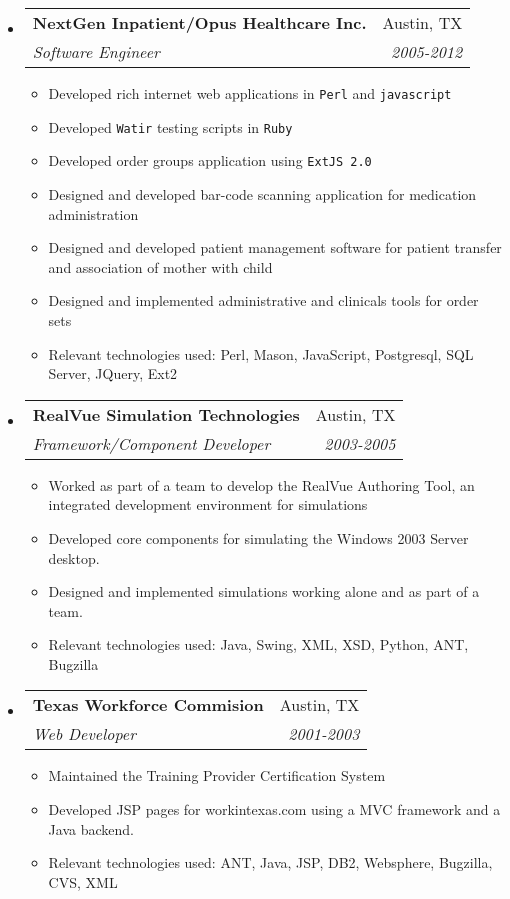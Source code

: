 \documentclass[letterpaper,10pt]{article}
\makeatletter
\newcommand{\resitem}[1]{\item #1 \vspace{-2pt}}
\newcommand{\ressubheading}[4]{

\begin{tabular*}{6.5in}{l@{\cftdotfill{\cftsecdotsep}\extracolsep{\fill}}r}

		\textbf{#1} & #2 \\

		\textit{#3} & \textit{#4} \\

\end{tabular*}\vspace{-6pt}}
\makeatother
\begin{document}
\begin{itemize}

\item

  \ressubheading{NextGen Inpatient/Opus Healthcare Inc.}{Austin, TX}{Software Engineer}{2005-2012}
  
  \begin{itemize}

    \resitem{Developed rich internet web applications in \texttt{Perl} and \texttt{javascript}}
    \resitem{Developed \texttt{Watir} testing scripts in \texttt{Ruby}}
    \resitem{Developed order groups application using \texttt{ExtJS 2.0}}
    \resitem{Designed and developed bar-code scanning application for medication
         		administration}
    \resitem{Designed and developed patient management software for patient transfer and 
		association of mother with child}
    \resitem{Designed and implemented administrative and clinicals tools for order sets}
    \resitem{Relevant technologies used: Perl, Mason, JavaScript, Postgresql, SQL Server, JQuery, Ext2}

  \end{itemize}

\item

  \ressubheading{RealVue Simulation Technologies}{Austin, TX}{Framework/Component Developer}{2003-2005}

  \begin{itemize}

    \resitem{Worked as part of a team to develop the RealVue Authoring Tool, an
      integrated development environment for simulations}
    \resitem{Developed core components for simulating the Windows 2003 Server desktop.}
    \resitem{Designed and implemented simulations working alone and as part of a team.}
    \resitem{Relevant technologies used: Java, Swing, XML, XSD, Python, ANT, Bugzilla}

  \end{itemize}

\item 

  \ressubheading{Texas Workforce Commision}{Austin, TX}{Web Developer}{2001-2003}
  \begin{itemize}
    
    \resitem{Maintained the Training Provider Certification System}
    \resitem{Developed JSP pages for workintexas.com using a MVC framework and a Java
	backend.}
    \resitem{Relevant technologies used: ANT, Java, JSP, DB2, Websphere, Bugzilla, CVS, XML}
  \end{itemize}


\end{itemize}
\end{document}
